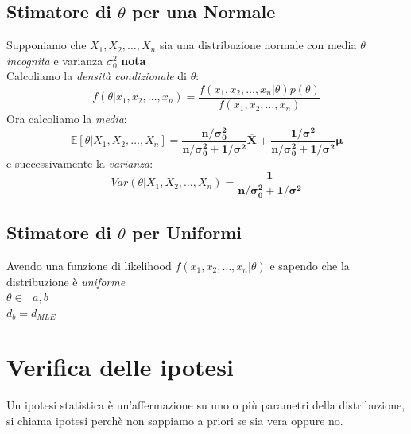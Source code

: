 \documentclass[]{article}
\newcommand{\ev}{\mathbb{E}[X]}
\renewcommand{\ev}[1]{\mathbb{E}\left[#1\right]}
\begin{document}
    \subsection{Stimatore di $\theta$ per una Normale}
    Supponiamo che $X_1, X_2, \ldots, X_n$ sia una distribuzione normale con media $\theta$ \textit{incognita} e varianza $\sigma^2_0$ \textbf{nota} \\[2ex]
    Calcoliamo la \textit{densità condizionale} di $\theta$:
    \[ f(\theta \rvert x_1, x_2, \ldots, x_n) = \frac{f(x_1, x_2, \ldots, x_n \rvert \theta) p(\theta)}{f(x_1, x_2, \ldots, x_n)} \]
    Ora calcoliamo la \textit{media}:
    \[ \ev{\theta \rvert X_1, X_2, \ldots, X_n } = \boldsymbol{\frac{n / \sigma^2_0}{n / \sigma^2_0 + 1 / \sigma^2} \overline{X} + \frac{1 / \sigma^2}{n / \sigma^2_0 + 1 / \sigma^2} \mu} \]
    e successivamente la \textit{varianza}:
    \[ Var(\theta \rvert X_1, X_2, \ldots, X_n) = \boldsymbol{\frac{1}{n / \sigma^2_0 + 1 / \sigma^2}} \]
    \subsection{Stimatore di $\theta$ per Uniformi}
    Avendo una funzione di likelihood $f(x_1, x_2, \ldots, x_n \rvert \theta)$ e sapendo che la distribuzione è \textit{uniforme} \\
    $\theta \in [a,b]$ \\
    $d_b = d_{MLE}$
    \newpage
    \section{Verifica delle ipotesi}
    Un ipotesi statistica è un'affermazione su uno o più parametri della distribuzione, si chiama ipotesi perchè non sappiamo a priori se sia vera oppure no.
\end{document}
